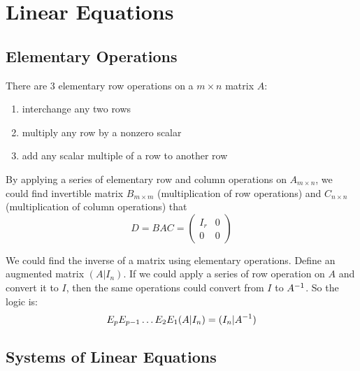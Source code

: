 \chapter{Linear Equations}

\section{Elementary Operations}

\begin{definition}
    There are 3 elementary row operations on a $m \times n$ matrix $A$:
\begin{enumerate}
    \item interchange any two rows
    \item multiply any row by a nonzero scalar
    \item add any scalar multiple of a row to another row
\end{enumerate}
\end{definition}


\begin{theorem}
    By applying a series of elementary row and column operations on $A_{m \times n}$, we could find invertible matrix $B_{m \times m}$ (multiplication of row operations) and $C_{n \times n}$ (multiplication of column operations) that
\begin{equation*}
    D = B A C = \begin{pmatrix}
        I_r & 0 \\
        0 & 0
    \end{pmatrix}
\end{equation*}
\end{theorem}

\begin{theorem}
    We could find the inverse of a matrix using elementary operations. Define an augmented matrix $(A|I_n)$. If we could apply a series of row operation on $A$ and convert it to $I$, then the same operations could convert from $I$ to ${A}^{-1}$. So the logic is:
\begin{equation}
    E_p E_{p-1} \hdots E_2 E_1 (A|I_n) = (I_n | {A}^{-1} )
\end{equation}
\end{theorem}







\section{Systems of Linear Equations}

